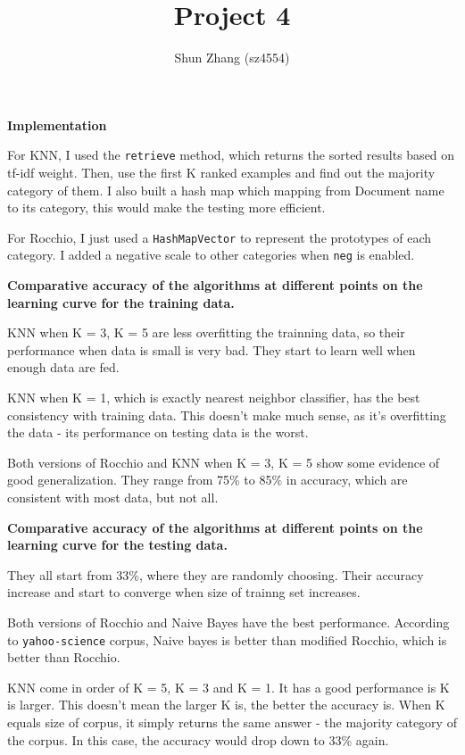 \documentclass[11pt]{article}
\title{Project 4}
\author{Shun Zhang (sz4554)}
\begin{document}
\maketitle

\textbf{Implementation}

For KNN, I used the \texttt{retrieve} method, which returns the sorted results based on tf-idf weight.
Then, use the first K ranked examples and find out the majority category of them.
I also built a hash map which mapping from Document name to its category, this would make the testing more efficient.

For Rocchio, I just used a \texttt{HashMapVector} to represent the prototypes of each category. I added a negative scale to other categories when \texttt{neg} is enabled.

\hfill

\textbf{Comparative accuracy of the algorithms at different points on the learning curve for the training data.}

KNN when K = 3, K = 5 are less overfitting the trainning data, so their performance when data is small is very bad. They start to learn well when enough data are fed.

KNN when K = 1, which is exactly nearest neighbor classifier, has the best consistency with training data. This doesn't make much sense, as it's overfitting the data - its performance on testing data is the worst.

Both versions of Rocchio and KNN when K = 3, K = 5 show some evidence of good generalization. They range from 75\% to 85\% in accuracy, which are consistent with most data, but not all. 

\hfill

\textbf{Comparative accuracy of the algorithms at different points on the learning curve for the testing data.}

They all start from 33\%, where they are randomly choosing. Their accuracy increase and start to converge when size of trainng set increases.

Both versions of Rocchio and Naive Bayes have the best performance. According to \texttt{yahoo-science} corpus, Naive bayes is better than modified Rocchio, which is better than Rocchio.

KNN come in order of K = 5, K = 3 and K = 1. It has a good performance is K is larger. This doesn't mean the larger K is, the better the accuracy is. When K equals size of corpus, it simply returns the same answer - the majority category of the corpus. In this case, the accuracy would drop down to 33\% again.
\end{document}
